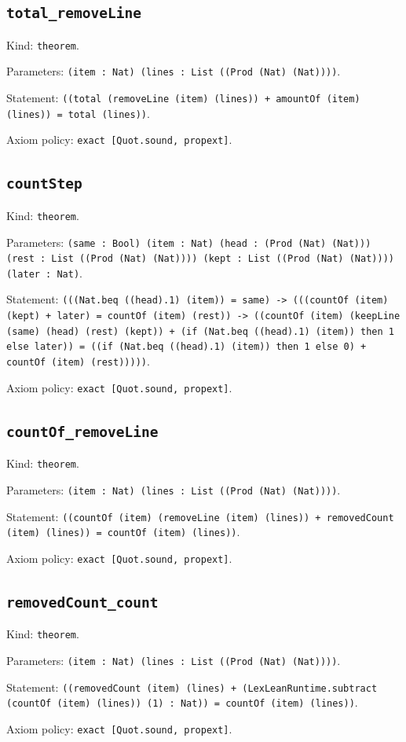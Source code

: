 \documentclass[11pt]{article}
\begin{document}
\subsection*{\texttt{total\_removeLine}}
\noindent Kind: \texttt{theorem}.\par
\noindent Parameters: \texttt{(item : Nat) (lines : List ((Prod (Nat) (Nat))))}.\par
\noindent Statement: \texttt{((total (removeLine (item) (lines)) + amountOf (item) (lines)) = total (lines))}.\par
\noindent Axiom policy: \texttt{exact [Quot.sound, propext]}.\par
\subsection*{\texttt{countStep}}
\noindent Kind: \texttt{theorem}.\par
\noindent Parameters: \texttt{(same : Bool) (item : Nat) (head : (Prod (Nat) (Nat))) (rest : List ((Prod (Nat) (Nat)))) (kept : List ((Prod (Nat) (Nat)))) (later : Nat)}.\par
\noindent Statement: \texttt{(((Nat.beq ((head).1) (item)) = same) -> (((countOf (item) (kept) + later) = countOf (item) (rest)) -> ((countOf (item) (keepLine (same) (head) (rest) (kept)) + (if (Nat.beq ((head).1) (item)) then 1 else later)) = ((if (Nat.beq ((head).1) (item)) then 1 else 0) + countOf (item) (rest)))))}.\par
\noindent Axiom policy: \texttt{exact [Quot.sound, propext]}.\par
\subsection*{\texttt{countOf\_removeLine}}
\noindent Kind: \texttt{theorem}.\par
\noindent Parameters: \texttt{(item : Nat) (lines : List ((Prod (Nat) (Nat))))}.\par
\noindent Statement: \texttt{((countOf (item) (removeLine (item) (lines)) + removedCount (item) (lines)) = countOf (item) (lines))}.\par
\noindent Axiom policy: \texttt{exact [Quot.sound, propext]}.\par
\subsection*{\texttt{removedCount\_count}}
\noindent Kind: \texttt{theorem}.\par
\noindent Parameters: \texttt{(item : Nat) (lines : List ((Prod (Nat) (Nat))))}.\par
\noindent Statement: \texttt{((removedCount (item) (lines) + (LexLeanRuntime.subtract (countOf (item) (lines)) (1) : Nat)) = countOf (item) (lines))}.\par
\noindent Axiom policy: \texttt{exact [Quot.sound, propext]}.\par
\end{document}
